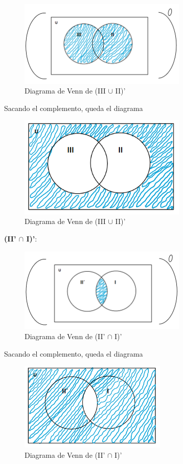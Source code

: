 \begin{figure}[htbp]
\centering
\includegraphics[width=8cm]{e/aa.png}
\caption[]{Diagrama de Venn de (III $\cup$ II)'}
\end{figure} 

\newpage

Sacando el complemento, queda el diagrama

\begin{figure}[htbp]
\centering
\includegraphics[width=8cm]{e/aaa.png}
\caption[]{Diagrama de Venn de (III $\cup$ II)'}
\end{figure} 

\textbf{(II' $\cap$ I)'}:

\begin{figure}[htbp]
\centering
\includegraphics[width=8cm]{e/bb.png}
\caption[]{Diagrama de Venn de (II' $\cap$ I)'}
\end{figure} 

Sacando el complemento, queda el diagrama

\begin{figure}[htbp]
\centering
\includegraphics[width=7cm]{e/bbb.png}
\caption[]{Diagrama de Venn de (II' $\cap$ I)'}
\end{figure} 


